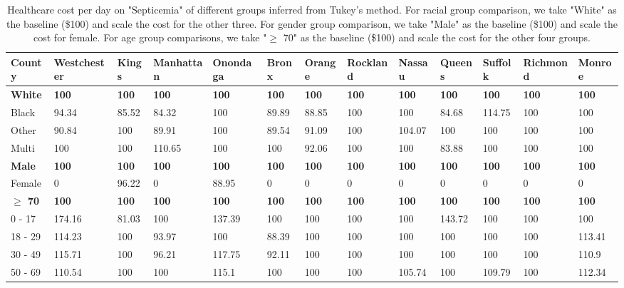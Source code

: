 \documentclass[10pt,twocolumn,letterpaper]{article}
\begin{document}
\begin{landscape}
\begin{table}[htb!]
\small
\begin{center}
\begin{tabular}{|l|l|l|l|l|l|l|l|l|l|l|l|l|}
\hline
\textbf{County} & \textbf{Westchester} & \textbf{Kings} & \textbf{Manhattan} & \textbf{Onondaga} & \textbf{Bronx} & \textbf{Orange} & \textbf{Rockland} & \textbf{Nassau} & \textbf{Queens} & \textbf{Suffolk} & \textbf{Richmond} & \textbf{Monroe} \\ \hline
\textbf{White} & \textbf{100} & \textbf{100} & \textbf{100} & \textbf{100} & \textbf{100} & \textbf{100} & \textbf{100} & \textbf{100} & \textbf{100} & \textbf{100} & \textbf{100} & \textbf{100} \\ \hline
Black & 94.34 & 85.52 & 84.32 & 100 & 89.89 & 88.85 & 100 & 100 & 84.68 & 114.75 & 100 & 100 \\ \hline
Other & 90.84 & 100 & 89.91 & 100 & 89.54 & 91.09 & 100 & 104.07 & 100 & 100 & 100 & 100 \\ \hline
Multi & 100 & 100 & 110.65 & 100 & 100 & 92.06 & 100 & 100 & 83.88 & 100 & 100 & 100 \\ \hline
\textbf{Male} & \textbf{100} & \textbf{100} & \textbf{100} & \textbf{100} & \textbf{100} & \textbf{100} & \textbf{100} & \textbf{100} & \textbf{100} & \textbf{100} & \textbf{100} & \textbf{100} \\ \hline
Female & 0 & 96.22 & 0 & 88.95 & 0 & 0 & 0 & 0 & 0 & 0 & 0 & 0 \\ \hline
\textbf{$\ge$ 70} & \textbf{100} & \textbf{100} & \textbf{100} & \textbf{100} & \textbf{100} & \textbf{100} & \textbf{100} & \textbf{100} & \textbf{100} & \textbf{100} & \textbf{100} & \textbf{100} \\ \hline
0 - 17 & 174.16 & 81.03 & 100 & 137.39 & 100 & 100 & 100 & 100 & 143.72 & 100 & 100 & 100 \\ \hline
18 - 29 & 114.23 & 100 & 93.97 & 100 & 88.39 & 100 & 100 & 100 & 100 & 100 & 100 & 113.41 \\ \hline
30 - 49 & 115.71 & 100 & 96.21 & 117.75 & 92.11 & 100 & 100 & 100 & 100 & 100 & 100 & 110.9 \\ \hline
50 - 69 & 110.54 & 100 & 100 & 115.1 & 100 & 100 & 100 & 105.74 & 100 & 109.79 & 100 & 112.34 \\ \hline
\end{tabular}
\end{center}
\caption{Healthcare cost per day on "Septicemia" of different groups inferred from Tukey's method. For racial group comparison, we take "White" as the baseline (\$100) and scale the cost for the other three. For gender group comparison, we take "Male" as the baseline (\$100) and scale the cost for female. For age group comparisons, we take "$\ge$ 70" as the baseline (\$100) and scale the cost for the other four groups. }
\end{table}
\end{landscape}
\end{document}
